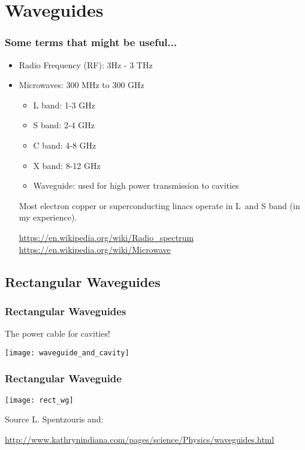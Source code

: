 \documentclass[professionalfonts,t]{beamer}
\begin{document}
\section{Waveguides}
\begin{frame}
\frametitle{Some terms that might be useful...}
\begin{itemize}
	\item Radio Frequency (RF): 3Hz - 3 THz
	\item Microwaves: 300 MHz to 300 GHz 
	\begin{itemize}
		\item L band: 1-3 GHz
		\item S band: 2-4 GHz
		\item C band: 4-8 GHz
		\item X band: 8-12 GHz
	\item Waveguide: used for high power transmission to cavities
	\end{itemize}

\vspace{1em}

Most electron copper or superconducting linacs 
operate in L~and S band (in my experience). 

\vspace{1em}
\url{https://en.wikipedia.org/wiki/Radio_spectrum}
\url{https://en.wikipedia.org/wiki/Microwave}
\end{itemize}
\end{frame}

\subsection{Rectangular Waveguides}
\begin{frame}
	\frametitle{Rectangular Waveguides}
	The power cable for cavities!
	\vspace{0.5em}
	
	\texttt{[image: waveguide\_and\_cavity]}
\end{frame}
\begin{frame}
\frametitle{Rectangular Waveguide}
\begin{center}
	\texttt{[image: rect\_wg]}
\end{center}

Source L. Spentzouris and:

\tiny\url{http://www.kathrynindiana.com/pages/science/Physics/waveguides.html}
\end{frame}
\end{document}

